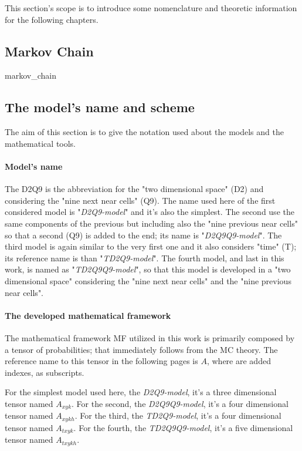 \documentclass[class=article, crop=false]{standalone}
\begin{document}
This section's scope is to introduce some nomenclature and theoretic information for the following chapters.

\subsection{Markov Chain} %
	{markov_chain}
	

\FloatBarrier
\subsection{The model's name and scheme}
The aim of this section is to give the notation used about the models and the mathematical tools.

\paragraph{Model's name} 
The D2Q9 is the abbreviation for the "two dimensional space" (D2) and considering the "nine next near cells" (Q9).
The name used here of the first considered model is "\emph{D2Q9-model}" and it's also the simplest.
The second use the same components of the previous but including also the "nine previous near cells" so that a second (Q9) is added to the end; its name is "\emph{D2Q9Q9-model}".
The third model is again similar to the very first one and it also considers "time" (T); its reference name is than "\emph{TD2Q9-model}".
The fourth model, and last in this work, is named as "\emph{TD2Q9Q9-model}", so that this model is developed in a "two dimensional space" considering the "nine next near cells" and the "nine previous near cells".


\paragraph{The developed mathematical framework}
The mathematical framework MF utilized in this work is primarily composed by a tensor of probabilities; that immediately follows from the MC theory.
The reference name to this tensor in the following pages is $A$, where are added indexes, as subscripts.

For the simplest model used here, the \emph{D2Q9-model}, it's a three dimensional tensor named $A_{x y k}$.
For the second, the \emph{D2Q9Q9-model}, it's a four dimensional tensor named $A_{x y k h}$.
For the third, the \emph{TD2Q9-model}, it's a four dimensional tensor named $A_{t x y k}$.
For the fourth, the \emph{TD2Q9Q9-model}, it's a five dimensional tensor named $A_{t x y k h}$.


\end{document}
